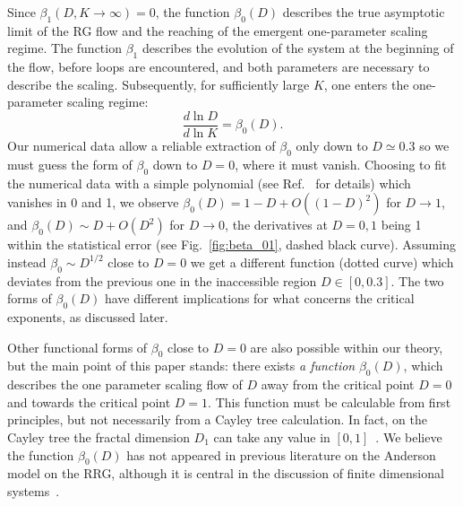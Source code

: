 \documentclass[reprint,aps,prl,superscriptaddress,english,nolongbibliography]{revtex4-2}
\begin{document}
{Since $\beta_1(D, K\to\infty)=0$, the function $\beta_0(D)$ describes the true asymptotic limit of the RG flow and the reaching of the emergent one-parameter scaling regime. The function $\beta_1$ describes the evolution of the system at the beginning of the flow, before loops are encountered, and both parameters are necessary to describe the scaling. Subsequently, for sufficiently large $K$, one enters the one-parameter scaling regime:
\begin{equation}
    \frac{d\ln D}{d\ln K}=\beta_0(D).
    \label{eq:one-param}
\end{equation}
Our numerical data allow a reliable extraction of $\beta_0$ only down to $D\simeq 0.3$ so we must guess the form of $\beta_0$ down to $D=0$, where it must vanish. Choosing to fit the numerical data with a simple polynomial (see Ref.~\cite{SupplMat} for details) which vanishes in 0 and 1, we observe $\beta_0(D)= 1-D+O((1-D)^2)$ for $D\to 1$, and $\beta_0(D)\sim D+O(D^2)$ for $D\to 0$, the derivatives at $D=0,1$ being 1 within the statistical error (see Fig.~\ref{fig:beta_01}, dashed black curve). Assuming instead $\beta_0\sim D^{1/2}$ close to $D=0$ we get a different function (dotted curve) which deviates from the previous one in the inaccessible region $D\in[0,0.3]$. The two forms of $\beta_0(D)$ have different implications for what concerns the critical exponents, as discussed later. 

Other functional forms of $\beta_0$ close to $D=0$ are also possible within our theory, but the main point of this paper stands: there exists {\it a function} $\beta_0(D)$, which describes the one parameter scaling flow of $D$ away from the critical point $D=0$ and towards the critical point $D=1$. This function must be calculable from first principles, but not necessarily from a Cayley tree calculation. In fact, on the Cayley tree the fractal dimension $D_1$ can take any value in $[0,1]$~\cite{monthus2011anderson,tikhonov2016fractality}. We believe the function $\beta_0(D)$ has not appeared in previous literature on the Anderson model on the RRG, although it is central in the discussion of finite dimensional systems~\cite{abrahams1979scaling}.
 
}
\end{document}
